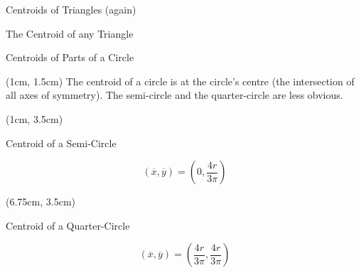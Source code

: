 \documentclass[9pt, xcolor={svgnames, x11names},professionalfonts]{beamer}
\begin{document}

\begin{frame}{Centroids of Triangles (again)}

	\begin{statsbox}{The Centroid of any Triangle}
		\mini[0.5]{
			\footnotesize
			
		}
	\end{statsbox}
\end{frame}


\begin{frame}{Centroids of Parts of a Circle}

	\begin{textblock*}{1\textwidth}(1cm, 1.5cm)
		\centering
		The centroid of a circle is at the circle's centre \lb(the intersection of all axes of symmetry).\parm
		The semi-circle and the quarter-circle are less obvious.
	\end{textblock*}

	\begin{textblock*}{0.475\textwidth}(1cm, 3.5cm)
		\begin{statsbox}{Centroid of a Semi-Circle}{%
				\begin{center}
					
					\footnotesize					
						$$\left(\overline{x}, \overline{y}\right) = \left(0, \frac{4r}{3\pi}\right) $$					
				\end{center}
			}
		\end{statsbox}
	\end{textblock*}

	\begin{textblock*}{0.475\textwidth}(6.75cm, 3.5cm)
		\begin{statsbox}{Centroid of a Quarter-Circle}{%
				\begin{center}					
					
					\footnotesize					
						$$\left(\overline{x}, \overline{y}\right) = \left(\frac{4r}{3\pi}, \frac{4r}{3\pi}\right) $$	
				\end{center}
			}
		\end{statsbox}
	\end{textblock*}
\end{frame}
\end{document}
